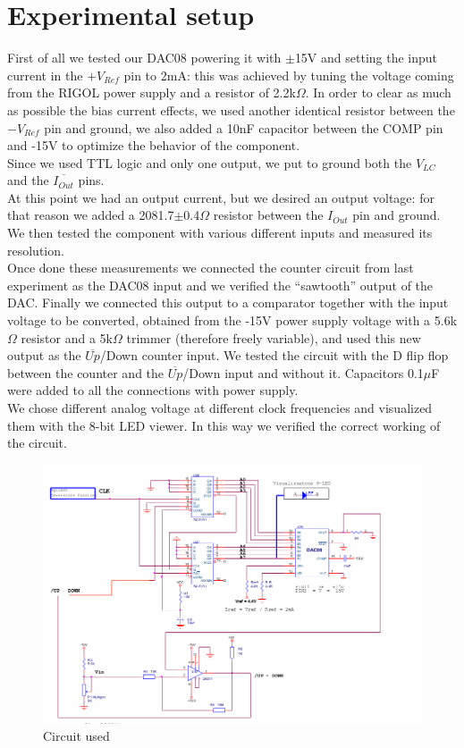 \section{Experimental setup}
First of all we tested our DAC08 powering it with \(\pm\)15V and setting the input current in the $+V_{Ref}$ pin to 2mA: this was achieved by tuning the voltage coming from the RIGOL power supply and a resistor of 2.2k\(\Omega\). In order to clear as much as possible the bias current effects, we used another identical resistor between the $-V_{Ref}$ pin and ground, we also added a 10nF capacitor between the COMP pin and -15V to optimize the behavior of the component.\\
Since we used TTL logic and only one output, we put to ground both the $V_{LC}$ and the $\overline{I_{Out}}$ pins.\\
At this point we had an output current, but we desired an output voltage: for that reason we added a 2081.7\(\pm\)0.4\(\Omega\) resistor between the $I_{Out}$ pin and ground. We then tested the component with various different inputs and measured its resolution. 
\\Once done these measurements we connected the counter circuit from last experiment as the DAC08 input and we verified the ``sawtooth'' output of the DAC. Finally we connected this output to a comparator together with the input voltage to be converted, obtained from the -15V power supply voltage with a 5.6k\(\Omega\) resistor and a 5k\(\Omega\) trimmer (therefore freely variable), and used this new output as the $\overline{Up}$/Down counter input. We tested the circuit with the D flip flop between the counter and the $\overline{Up}$/Down input and without it. Capacitors 0.1\(\mu\)F were added to all the connections with power supply.\\
We chose different analog voltage at different clock frequencies and visualized them with the 8-bit LED viewer. In this way we verified the correct working of the circuit.

\begin{figure}[H]
\centering
\includegraphics[width=.8\textwidth]{12/circuit.png}
\caption{Circuit used}
\end{figure}

